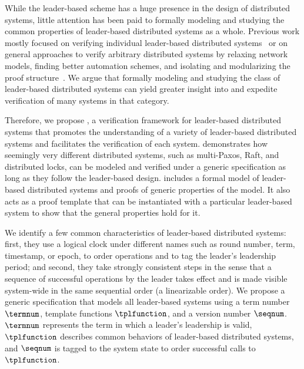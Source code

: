 While the leader-based scheme has a huge presence in the design of distributed systems,
little attention has been paid to formally modeling and studying the common properties
of leader-based distributed systems as a whole. Previous work mostly focused
on verifying individual leader-based distributed systems~\cite{ironfleet, cppraft}
or on general approaches to verify arbitrary distributed systems by relaxing network
models, finding better automation schemes, and isolating and modularizing the
proof structure~\cite{verdi, disel, modular}. We argue that formally
modeling and studying the class of leader-based distributed systems can yield greater
insight into and expedite verification of many systems in that category.


Therefore, we propose \sysname{}, a verification framework for
leader-based distributed systems that promotes the understanding of
a variety of leader-based distributed systems and facilitates the verification
of each system. \sysname{} demonstrates how seemingly very different distributed systems,
such as multi-Paxos, Raft, and distributed locks, can be modeled and verified under
a generic specification as long as they follow the leader-based design.
\sysname{} includes a formal model of leader-based distributed systems and
proofs of generic properties of the model.
It also acts as a proof template that can be instantiated with a particular leader-based
system to show that the general properties hold for it.



We identify a few common characteristics of leader-based distributed systems:
first, they use a logical clock under different names such as round number,
term, timestamp, or epoch, to order operations and to tag the leader's
leadership period;
and second, they take strongly consistent steps in the sense that a
sequence of successful operations by the leader takes effect and is made visible
system-wide in the same sequential order (a linearizable order).
We propose a generic specification that models all leader-based systems using a
term number $\termnum$, template functions $\tplfunction$, and
a version number $\seqnum$. $\termnum$ represents the term in which a leader's leadership is valid,
$\tplfunction$ describes common behaviors of leader-based distributed systems,
and $\seqnum$ is tagged to the system state to order successful calls to $\tplfunction$.

